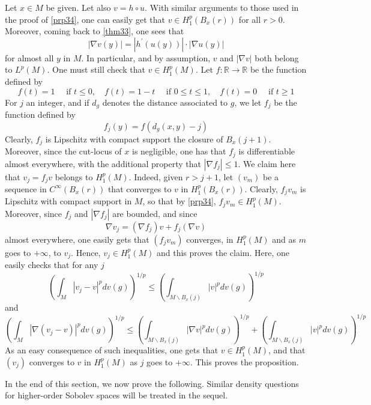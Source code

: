 \documentclass[12pt,hyperref,a4paper,UTF8]{ctexart}
\begin{document}
\begin{Proof}
 Let $x \in M$ be given. Let also $v=h \circ u$. With similar arguments to those used in the proof of \autoref{prp34}, one can easily get that $v \in H_1^p\left(B_x(r)\right)$ for all $r>0$. Moreover, coming back to \autoref{thm33}, one sees that
$$
|\nabla v(y)|=\left|h^{\prime}(u(y))\right| \cdot|\nabla u(y)|
$$
for almost all $y$ in $M$. In particular, and by assumption, $v$ and $|\nabla v|$ both belong to $L^p(M)$. One must still check that $v \in H_1^p(M)$. Let $f: \mathbb{R} \rightarrow \mathbb{R}$ be the function defined by
$$
f(t)=1 \quad \text { if } t \leq 0, \quad f(t)=1-t \quad \text { if } 0 \leq t \leq 1, \quad f(t)=0 \quad \text { if } t \geq 1
$$
For $j$ an integer, and if $d_g$ denotes the distance associated to $g$, we let $f_j$ be the function defined by
$$
f_j(y)=f\left(d_g(x, y)-j\right)
$$
Clearly, $f_j$ is Lipschitz with compact support the closure of $B_x(j+1)$. Moreover, since the cut-locus of $x$ is negligible, one has that $f_j$ is differentiable almost everywhere, with the additional property that $\left|\nabla f_j\right| \leq 1$. We claim here that $v_j=f_j v$ belongs to $H_1^p(M)$. Indeed, given $r>j+1$, let $\left(v_m\right)$ be a sequence in $C^{\infty}\left(B_x(r)\right)$ that converges to $v$ in $H_1^p\left(B_x(r)\right)$. Clearly, $f_j v_m$ is Lipschitz with compact support in $M$, so that by \autoref{prp34}, $f_j v_m \in H_1^p(M)$. Moreover, since $f_j$ and $\left|\nabla f_j\right|$ are bounded, and since
$$
\nabla v_j=\left(\nabla f_j\right) v+f_j(\nabla v)
$$
almost everywhere, one easily gets that $\left(f_j v_m\right)$ converges, in $H_1^p(M)$ and as $m$ goes to $+\infty$, to $v_j$. Hence, $v_j \in H_1^p(M)$ and this proves the claim. Here, one easily checks that for any $j$
$$
\left(\int_M\left|v_j-v\right|^p d v(g)\right)^{1 / p} \leq\left(\int_{M \backslash B_x(j)}|v|^p d v(g)\right)^{1 / p}
$$
and
$$
\left(\int_M\left|\nabla\left(v_j-v\right)\right|^p d v(g)\right)^{1 / p} \leq\left(\int_{M \backslash B_x(j)}|\nabla v|^p d v(g)\right)^{1 / p}+\left(\int_{M \backslash B_x(j)}|v|^p d v(g)\right)^{1 / p}
$$
As an easy consequence of such inequalities, one gets that $v \in H_1^p(M)$, and that $\left(v_j\right)$ converges to $v$ in $H_1^p(M)$ as $j$ goes to $+\infty$. This proves the proposition.
\end{Proof}

\vskip 3pt
In the end of this section, we now prove the following. Similar density questions for higher-order Sobolev spaces will be treated in the sequel.
\end{document}
